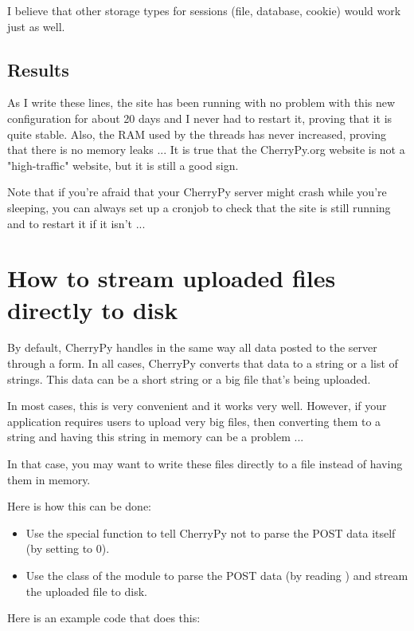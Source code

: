 \documentclass{manual}
\begin{document}
I believe that other storage types for sessions (file, database, cookie) would work just as well.

\section{Results}
As I write these lines, the site has been running with no problem with this new configuration for about 20 days and
I never had to restart it, proving that it is quite stable. Also, the RAM used by the threads has never increased,
proving that there is no memory leaks ...
It is true that the CherryPy.org website is not a "high-traffic" website, but it is still a good sign.

Note that if you're afraid that your CherryPy server might crash while you're sleeping, you can always set up a cronjob
to check that the site is still running and to restart it if it isn't ...

\chapter{How to stream uploaded files directly to disk}

By default, CherryPy handles in the same way all data posted to the server through a form. In all cases, CherryPy
converts that data to a string or a list of strings. This data can be a short string or a big file that's being uploaded.

In most cases, this is very convenient and it works very well. However, if your application requires users to upload very
big files, then converting them to a string and having this string in memory can be a problem ...

In that case, you may want to write these files directly to a file instead of having them in memory.

Here is how this can be done:
\begin{itemize}
\item
Use the  special function to tell CherryPy not to parse the POST data itself (by setting  to 0).
\item
Use the  class of the  module to parse the POST data (by reading ) and stream the uploaded file to disk.
\end{itemize}

Here is an example code that does this:
\end{document}
